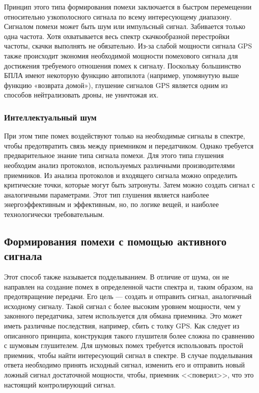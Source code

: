 Принцип этого типа формирования помехи заключается в быстром перемещении относительно узкополосного сигнала по всему интересующему диапазону. Сигналом помехи может быть шум или импульсный сигнал. Забивается только одна частота. Хотя охватывается весь спектр скачкообразной перестройки частоты, скачки выполнять не обязательно. Из-за слабой мощности сигнала GPS также происходит экономия необходимой мощности помехового сигнала для достижения требуемого отношения помех к сигналу. Поскольку большинство БПЛА имеют некоторую функцию автопилота (например, упомянутую выше функцию «возврата домой»), глушение сигналов GPS является одним из способов нейтрализовать дроны, не уничтожая их.

\subsubsection{Интеллектуальный шум}

При этом типе помех воздействуют только на необходимые сигналы в спектре, чтобы предотвратить связь между приемником и передатчиком. Однако требуется предварительное знание типа сигнала помехи. Для этого типа глушения необходим анализ протоколов, используемых различными производителями приемников. Из анализа протоколов и входящего сигнала можно определить критические точки, которые могут быть затронуты. Затем можно создать сигнал с аналогичными параметрами. Этот тип глушения является наиболее энергоэффективным и эффективным, но, по логике вещей, и наиболее технологически требовательным.

\subsection{Формирования помехи с помощью активного сигнала}

Этот способ также называется подделыванием. В отличие от шума, он не направлен на создание помех в определенной части спектра и, таким образом, на предотвращение передачи. Его цель --- создать и отправить сигнал, аналогичный исходному сигналу. Такой сигнал с более высоким уровнем мощности, чем у законного передатчика, затем используется для обмана приемника. Это может иметь различные последствия, например, сбить с толку GPS. Как следует из описанного принципа, конструкция такого глушителя более сложна по сравнению с шумовым глушителем. Для шумовых помех требуется использовать простой приемник, чтобы найти интересующий сигнал в спектре. В случае подделывания ответа необходимо принять исходный сигнал, изменить его и отправить новый ложный сигнал достаточной мощности, чтобы, приемник <<поверил>>, что это настоящий контролирующий сигнал.

